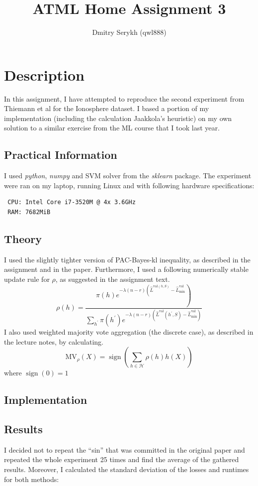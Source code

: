 \documentclass[a4paper]{article}
\title{\vspace{-5cm}ATML Home Assignment 3}
\author{Dmitry Serykh (qwl888)}
\begin{document}
\maketitle
\section{Description}
In this assignment, I have attempted to reproduce the second experiment from
Thiemann et al for the Ionosphere dataset. I based a portion of my implementation
(including the calculation Jaakkola's heuristic) on my own solution to a similar
exercise from the ML course that I took last year.

\subsection{Practical Information}
I used \emph{python}, \emph{numpy} and SVM solver
from the \emph{sklearn} package. The experiment were ran on my laptop, running
Linux and with following hardware specifications:
\begin{verbatim}
 CPU: Intel Core i7-3520M @ 4x 3.6GHz
 RAM: 7682MiB
\end{verbatim}

\subsection{Theory}
I used the slightly tighter version of PAC-Bayes-kl inequality, as described in
the assignment and in the paper. Furthermore, I used a following numerically stable
update rule for $\rho$, as suggested in the assignment text.
\[
\rho(h) = 
\frac{\left.\pi(h) e^{-\lambda(n-r)\left(\hat{L}^{\mathrm{val}(h, S)}-\hat{L}_{\mathrm{min}}^{\mathrm{val}}\right.}\right)}{\sum_{h^{\prime}} \pi\left(h^{\prime}\right) e^{-\lambda(n-r)\left(\hat{L}^{\mathrm{val}}\left(h^{\prime}, S\right)-\hat{L}_{\mathrm{min}}^{\mathrm{val}}\right)}}
\]
I also used weighted majority vote aggregation (the discrete case), as described
in the lecture notes, by calculating.
\[
\mathrm{MV}_{\rho}(X)=\operatorname{sign}\left(\sum_{h \in \mathcal{H}} \rho(h) h(X)\right)
\]
where $\operatorname{sign}(0)=1$

\subsection{Implementation}

\subsection{Results}
I decided not to repeat the ``sin'' that was committed in the original paper and
repeated the whole experiment 25 times and find the average of the gathered
results. Moreover, I calculated the standard deviation of the losses and
runtimes for both methods:
\end{document}
